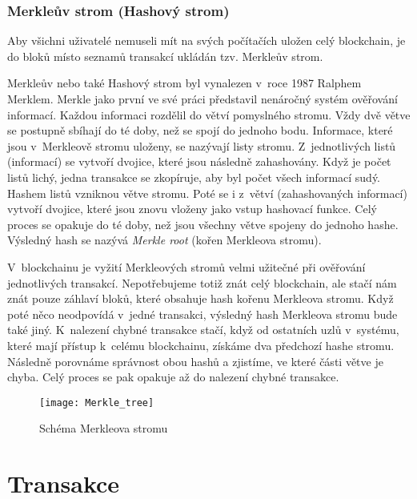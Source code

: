 \documentclass[12pt]{report}			%
\begin{document}
		\subsection{Merkleův strom (Hashový strom)}{	
Aby všichni uživatelé nemuseli mít na svých počítačích uložen celý blockchain, je do bloků místo seznamů transakcí ukládán tzv. Merkleův strom.		

Merkleův nebo také Hashový strom byl vynalezen v~roce 1987 Ralphem Merklem. Merkle jako první ve své práci představil nenáročný systém ověřování informací. Každou informaci rozdělil do větví pomyslného stromu. Vždy dvě větve se postupně sbíhají do té doby, než se spojí do jednoho bodu. Informace, které jsou v~Merkleově stromu uloženy, se nazývají listy stromu. Z~jednotlivých listů (informací) se vytvoří dvojice, které jsou následně zahashovány. Když je počet listů lichý, jedna transakce se zkopíruje, aby byl počet všech informací sudý. Hashem listů vzniknou větve stromu. Poté se i z~větví (zahashovaných informací) vytvoří dvojice, které jsou znovu vloženy jako vstup hashovací funkce. Celý proces se opakuje do té doby, než jsou všechny větve spojeny do jednoho hashe. Výsledný hash se nazývá \textit{Merkle root} (kořen Merkleova stromu). \cite{Frankenfield2021}

V~blockchainu je vyžití Merkleových stromů velmi užitečné při ověřování jednotlivých transakcí. Nepotřebujeme totiž znát celý blockchain, ale stačí nám znát pouze záhlaví bloků, které obsahuje hash kořenu Merkleova stromu. Když poté něco neodpovídá v~jedné transakci, výsledný hash Merkleova stromu bude také jiný. K~nalezení chybné transakce stačí, když od ostatních uzlů v~systému, které mají přístup k~celému blockchainu, získáme dva předchozí hashe stromu. Následně porovnáme správnost obou hashů a zjistíme, ve které části větve je chyba. Celý proces se pak opakuje až do nalezení chybné transakce. \cite{Frankenfield2021} \cite{Nakamoto2008} 
		}

\begin{figure}[h]
\caption{Schéma Merkleova stromu \cite{Antonopoulos2017}}
\texttt{[image: Merkle\_tree]}	
\centering
\label{Merkle_tree}
\end{figure}

		\chapter{Transakce}
\end{document}
